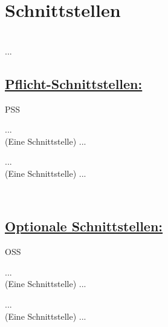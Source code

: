 %
%


%
%
\clearpage


\section{Schnittstellen}
\label{NU:Schnittstellen}~\\

...
\\


\subsection*{\underline{Pflicht-Schnittstellen:}}

\begin{ids}{\gls{PSS}}

	\id[ 11] ... \hfill\\
	
	(Eine Schnittstelle) ...
	
	\id[100] ... \hfill\\
	
	(Eine Schnittstelle) ...

\end{ids}

~\\


%
%
\clearpage


\subsection*{\underline{Optionale Schnittstellen:}}

\begin{ids}{\gls{OSS}}

	\id[ 11] ... \hfill\\
	
	(Eine Schnittstelle) ...
	
	\id[100] ... \hfill\\
	
	(Eine Schnittstelle) ...

\end{ids}


